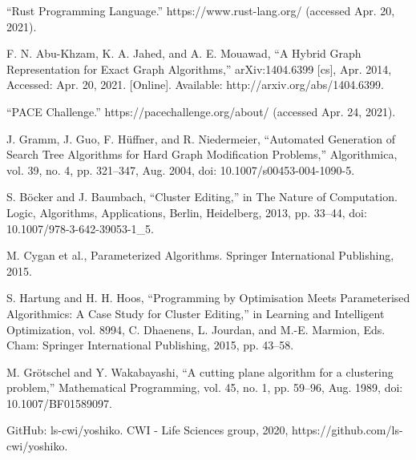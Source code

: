 \documentclass[12pt,oneside,english,parskip=full,headings=small]{scrbook}
\theoremstyle{definition}
\begin{document}
\begin{thebibliography}{99}
“Rust Programming Language.” https://www.rust-lang.org/ (accessed Apr. 20, 2021).

F. N. Abu-Khzam, K. A. Jahed, and A. E. Mouawad, “A Hybrid Graph Representation for Exact Graph
Algorithms,” arXiv:1404.6399 [cs], Apr. 2014, Accessed: Apr. 20, 2021. [Online]. Available:
http://arxiv.org/abs/1404.6399.

“PACE Challenge.” https://pacechallenge.org/about/ (accessed Apr. 24, 2021).

J. Gramm, J. Guo, F. Hüffner, and R. Niedermeier, “Automated Generation of Search Tree Algorithms
for Hard Graph Modification Problems,” Algorithmica, vol. 39, no. 4, pp. 321–347, Aug. 2004, doi:
10.1007/s00453-004-1090-5.

S. Böcker and J. Baumbach, “Cluster Editing,” in The Nature of Computation. Logic, Algorithms,
Applications, Berlin, Heidelberg, 2013, pp. 33–44, doi: 10.1007/978-3-642-39053-1\_5.

M. Cygan et al., Parameterized Algorithms. Springer International Publishing, 2015.

S. Hartung and H. H. Hoos, “Programming by Optimisation Meets Parameterised Algorithmics: A Case
Study for Cluster Editing,” in Learning and Intelligent Optimization, vol. 8994, C. Dhaenens, L.
Jourdan, and M.-E. Marmion, Eds. Cham: Springer International Publishing, 2015, pp. 43–58.

M. Grötschel and Y. Wakabayashi, “A cutting plane algorithm for a clustering problem,”
Mathematical Programming, vol. 45, no. 1, pp. 59–96, Aug. 1989, doi: 10.1007/BF01589097.

GitHub: ls-cwi/yoshiko. CWI - Life Sciences group, 2020, https://github.com/ls-cwi/yoshiko.

\end{thebibliography}
\end{document}
